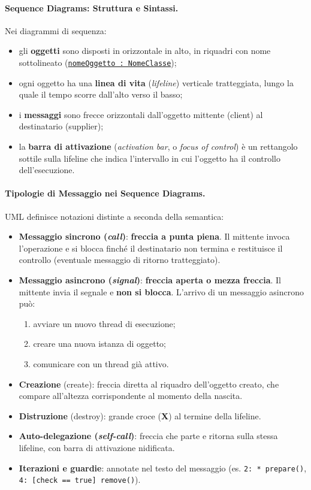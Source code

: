 \documentclass[12pt]{extarticle}
\begin{document}
\paragraph{Sequence Diagrams: Struttura e Sintassi.}
Nei diagrammi di sequenza:
\begin{itemize}
    \item gli \textbf{oggetti} sono disposti in orizzontale in alto, in riquadri con nome sottolineato (\underline{\texttt{nomeOggetto : NomeClasse}});
    \item ogni oggetto ha una \textbf{linea di vita} (\textit{lifeline}) verticale tratteggiata, lungo la quale il tempo scorre dall'alto verso il basso;
    \item i \textbf{messaggi} sono frecce orizzontali dall'oggetto mittente (client) al destinatario (supplier);
    \item la \textbf{barra di attivazione} (\textit{activation bar}, o \textit{focus of control}) è un rettangolo sottile sulla lifeline che indica l'intervallo in cui l'oggetto ha il controllo dell'esecuzione.
\end{itemize}

\paragraph{Tipologie di Messaggio nei Sequence Diagrams.}
UML definisce notazioni distinte a seconda della semantica:
\begin{itemize}
    \item \textbf{Messaggio sincrono (\textit{call})}: \textbf{freccia a punta piena}. Il mittente invoca l'operazione e si blocca finché il destinatario non termina e restituisce il controllo (eventuale messaggio di ritorno tratteggiato).
    \item \textbf{Messaggio asincrono (\textit{signal})}: \textbf{freccia aperta o mezza freccia}. Il mittente invia il segnale e \textbf{non si blocca}. L'arrivo di un messaggio asincrono può:
    \begin{enumerate}
        \item avviare un nuovo thread di esecuzione;
        \item creare una nuova istanza di oggetto;
        \item comunicare con un thread già attivo.
    \end{enumerate}
    \item \textbf{Creazione} (\guillemotleft create\guillemotright): freccia diretta al riquadro dell'oggetto creato, che compare all'altezza corrispondente al momento della nascita.
    \item \textbf{Distruzione} (\guillemotleft destroy\guillemotright): grande croce (\textbf{X}) al termine della lifeline.
    \item \textbf{Auto-delegazione (\textit{self-call})}: freccia che parte e ritorna sulla stessa lifeline, con barra di attivazione nidificata.
    \item \textbf{Iterazioni e guardie}: annotate nel testo del messaggio (es. \texttt{2: * prepare()}, \texttt{4: [check == true] remove()}).
\end{itemize}
\end{document}
